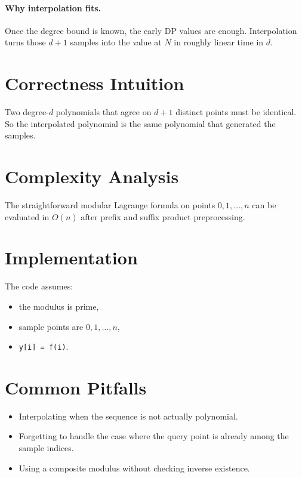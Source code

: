 \paragraph{Why interpolation fits.}
Once the degree bound is known, the early DP values are enough. Interpolation turns those \(d+1\) samples into the value
at \(N\) in roughly linear time in \(d\).

\section*{Correctness Intuition}

Two degree-\(d\) polynomials that agree on \(d+1\) distinct points must be identical. So the interpolated polynomial is
the same polynomial that generated the samples.

\section*{Complexity Analysis}

The straightforward modular Lagrange formula on points \(0,1,\dots,n\) can be evaluated in \(O(n)\) after prefix and
suffix product preprocessing.

\section*{Implementation}

The code assumes:

\begin{itemize}
  \item the modulus is prime,
  \item sample points are \(0,1,\dots,n\),
  \item \texttt{y[i] = f(i)}.
\end{itemize}

\section*{Common Pitfalls}

\begin{itemize}
  \item Interpolating when the sequence is not actually polynomial.
  \item Forgetting to handle the case where the query point is already among the sample indices.
  \item Using a composite modulus without checking inverse existence.
\end{itemize}


